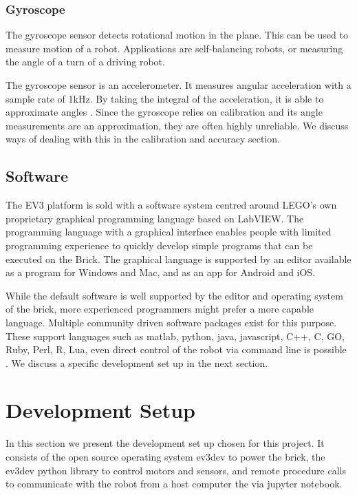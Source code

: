 \documentclass[11pt, a4paper]{article}
\begin{document}
\subsubsection*{Gyroscope}
The gyroscope sensor detects rotational motion in the plane. This can be used to measure motion of a robot. Applications are self-balancing robots, or measuring the angle of a turn of a driving robot.

The gyroscope sensor is an accelerometer. It measures angular acceleration with a sample rate of 1kHz. By taking the integral of the acceleration, it is able to approximate angles \cite{gyroscope}. Since the gyroscope relies on calibration and its angle measurements are an approximation, they are often highly unreliable. We discuss ways of dealing with this in the calibration and accuracy section.


\subsection{Software}
The EV3 platform is sold with a software system centred around LEGO's own proprietary graphical programming language based on LabVIEW. The programming language with a graphical interface enables people with limited programming experience to quickly develop simple programs that can be executed on the Brick. The graphical language is supported by an editor available as a program for Windows and Mac, and as an app for Android and iOS.

While the default software is well supported by the editor and operating system of the brick, more experienced programmers might prefer a more capable language. Multiple community driven software packages exist for this purpose. These support languages such as matlab, python, java, javascript, C++, C, GO, Ruby, Perl, R, Lua, even direct control of the robot via command line is possible \cite{ev3dev}. We discuss a specific development set up in the next section.



\section{Development Setup}
In this section we present the development set up chosen for this project. It consists of the open source operating system ev3dev to power the brick, the ev3dev python library to control motors and sensors, and remote procedure calls to communicate with the robot from a host computer the via jupyter notebook.
\end{document}
